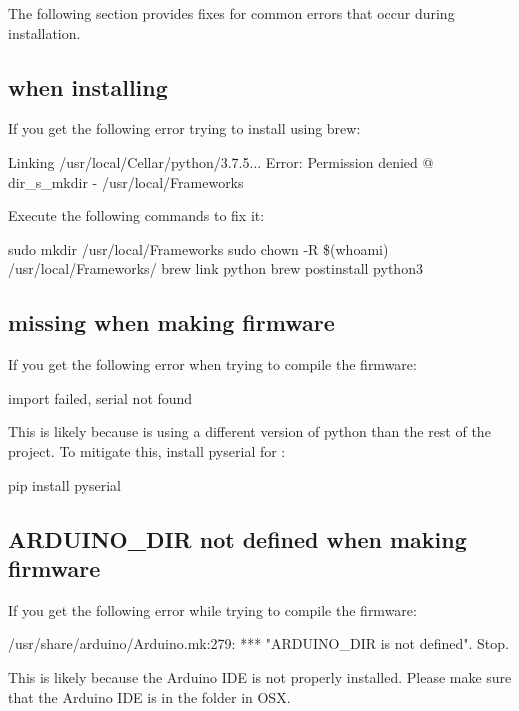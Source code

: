 The following section provides fixes for common errors that occur during
installation.

\subsection{ when installing }

\noindent If you get the following error trying to install
 using brew:

\begin{snippet}
Linking /usr/local/Cellar/python/3.7.5... Error: Permission denied @ dir_s_mkdir
- /usr/local/Frameworks
\end{snippet}

\noindent Execute the following commands to fix it:

\begin{snippet}
sudo mkdir /usr/local/Frameworks
sudo chown -R \$(whoami) /usr/local/Frameworks/
brew link python
brew postinstall python3
\end{snippet}

\subsection{ missing when making firmware}


\noindent If you get the following error when trying to compile the firmware:

\begin{snippet}
  import failed, serial not found
\end{snippet}

\noindent This is likely because  is using a different version of python than the rest of the project. To mitigate this, install pyserial for :

\begin{snippet}
pip install pyserial
\end{snippet}


\subsection{ARDUINO\_DIR not defined when making firmware}

\noindent If you get the following error while trying to compile the firmware:

\begin{snippet}
/usr/share/arduino/Arduino.mk:279: *** "ARDUINO_DIR is not defined". Stop.
\end{snippet}

\noindent This is likely because the Arduino IDE is not properly installed. Please make
sure that the Arduino IDE is in the  folder in OSX. 
